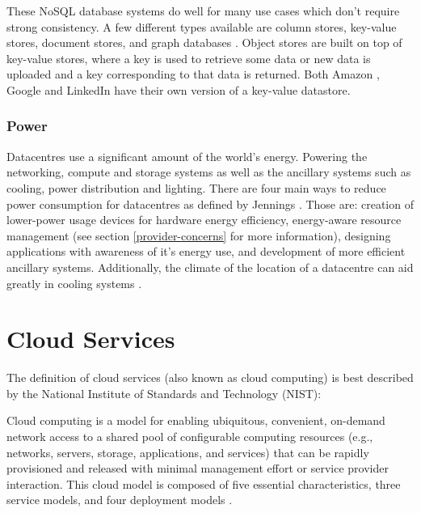 \documentclass[12pt]{article}
\begin{document}
These NoSQL database systems do well for many use cases which don't require strong consistency. A few different types available are column stores, key-value stores, document stores, and graph databases \cite{graphDB2013}. Object stores are built on top of key-value stores, where a key is used to retrieve some data or new data is uploaded and a key corresponding to that data is returned. Both Amazon \cite{dynamodb}, Google \cite{cassandra} and LinkedIn \cite{voldemort} have their own version of a key-value datastore.


\subsubsection{Power} \label{ssub:power}

Datacentres use a significant amount of the world's energy. Powering the networking, compute and storage systems as well as the ancillary systems such as cooling, power distribution and lighting.
There are four main ways to reduce power consumption for datacentres as defined by Jennings \cite{Jennings2015}. Those are: creation of lower-power usage devices for hardware energy efficiency, energy-aware resource management (see section \ref{provider-concerns} for more information), designing applications with awareness of it's energy use, and development of more efficient ancillary systems. Additionally, the climate of the location of a datacentre can aid greatly in cooling systems \cite{norwaydatacentre}.


\section{Cloud Services} \label{sec:cloud-services}

The definition of cloud services (also known as cloud computing) is best described by the National Institute of Standards and Technology (NIST):

\begin{displayquote}
Cloud computing is a model for enabling ubiquitous, convenient, on-demand network access to a shared pool of configurable computing resources (e.g., networks, servers, storage, applications, and services) that can be rapidly provisioned and released with minimal management effort or service provider interaction. This cloud model is composed of five essential characteristics, three service models, and four deployment models \cite{mell2011nist}.
\end{displayquote}
\end{document}
